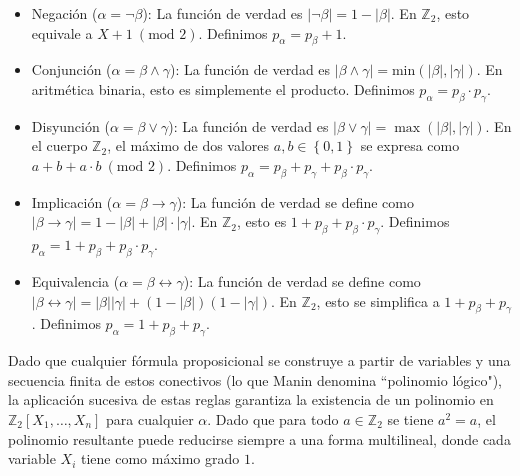     \begin{itemize}
       \item Negación ($\alpha = \neg \beta$): La función de verdad es $|\neg \beta|=1-|\beta|$. En $\mathbb{Z}_2$, esto equivale a $X+1\ (\text{mod } 2)$. Definimos $p_\alpha=p_\beta +1$.
       \item Conjunción ($\alpha = \beta \wedge \gamma$): La función de verdad es $|\beta \wedge \gamma|=\text{min}(|\beta|,|\gamma|)$. En aritmética binaria, esto es simplemente el producto. Definimos $p_\alpha=p_\beta \cdot p_\gamma$.
       \item Disyunción ($\alpha=\beta \vee \gamma$): La función de verdad es $|\beta \vee \gamma|=\max(|\beta|,|\gamma|)$. En el cuerpo $\mathbb{Z}_2$, el máximo de dos valores $a,b\in \left\lbrace 0,1 \right\rbrace$ se expresa como $a+b+a\cdot b \ (\text{mod } 2)$. Definimos $p_\alpha = p_\beta + p_\gamma + p_\beta \cdot p_\gamma$.
       \item Implicación ($\alpha = \beta \rightarrow \gamma$): La función de verdad se define como $|\beta \rightarrow \gamma|=1-|\beta|+|\beta|\cdot|\gamma|$. En $\mathbb{Z}_2$, esto es $1+p_\beta + p_\beta \cdot p_\gamma$. Definimos $p_\alpha = 1+p_\beta+p_\beta\cdot p_\gamma$.
       \item Equivalencia ($\alpha=\beta \leftrightarrow \gamma$): La función de verdad se define como $|\beta \leftrightarrow \gamma|=|\beta||\gamma|+(1-|\beta|)(1-|\gamma|)$. En $\mathbb{Z}_2$, esto se simplifica a $1+p_\beta + p_\gamma$. Definimos $p_\alpha = 1+p_\beta + p_\gamma$.
    \end{itemize}
    Dado que cualquier fórmula proposicional se construye a partir de variables y una secuencia finita de estos conectivos (lo que Manin denomina ``polinomio lógico"), la aplicación sucesiva de estas reglas garantiza la existencia de un polinomio en $\mathbb{Z}_2[X_1,\dots, X_n]$ para cualquier $\alpha$.  Dado que para todo $a \in \mathbb{Z}_2$ se tiene $a^2 = a$, el polinomio resultante puede reducirse siempre a una forma multilineal, donde cada variable $X_i$ tiene como máximo grado $1$.\\

